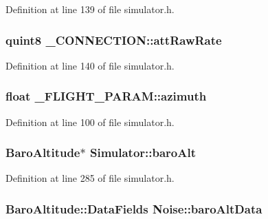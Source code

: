 \-Definition at line 139 of file simulator.\-h.

\hypertarget{group___h_i_t_l_plugin_ga70d4f6a60b23f4545d46ff7dfe4c710e}{
\subsubsection[{att\-Raw\-Rate}]{\setlength{\rightskip}{0pt plus 5cm}quint8 {\bf \-\_\-\-C\-O\-N\-N\-E\-C\-T\-I\-O\-N\-::att\-Raw\-Rate}}}\label{group___h_i_t_l_plugin_ga70d4f6a60b23f4545d46ff7dfe4c710e}


\-Definition at line 140 of file simulator.\-h.

\hypertarget{group___h_i_t_l_plugin_ga849192344fdd21a6a53e00920b89bbdc}{
\subsubsection[{azimuth}]{\setlength{\rightskip}{0pt plus 5cm}float {\bf \-\_\-\-F\-L\-I\-G\-H\-T\-\_\-\-P\-A\-R\-A\-M\-::azimuth}}}\label{group___h_i_t_l_plugin_ga849192344fdd21a6a53e00920b89bbdc}


\-Definition at line 100 of file simulator.\-h.

\hypertarget{group___h_i_t_l_plugin_ga107f3bf3d4cc0c45cc8677742d4445eb}{
\subsubsection[{baro\-Alt}]{\setlength{\rightskip}{0pt plus 5cm}\-Baro\-Altitude$\ast$ {\bf \-Simulator\-::baro\-Alt}}}\label{group___h_i_t_l_plugin_ga107f3bf3d4cc0c45cc8677742d4445eb}


\-Definition at line 285 of file simulator.\-h.

\hypertarget{group___h_i_t_l_plugin_gab586e8f2c72c1e42c715debf0bd202b1}{
\subsubsection[{baro\-Alt\-Data}]{\setlength{\rightskip}{0pt plus 5cm}\-Baro\-Altitude\-::\-Data\-Fields {\bf \-Noise\-::baro\-Alt\-Data}}}\label{group___h_i_t_l_plugin_gab586e8f2c72c1e42c715debf0bd202b1}


